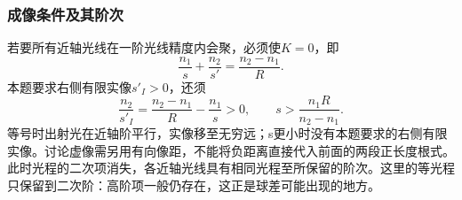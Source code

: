 \documentclass[UTF8,fontset=fandol,a4paper,11pt]{ctexart}
\begin{document}
\subsubsection*{成像条件及其阶次}
若要所有近轴光线在一阶光线精度内会聚，必须使$K=0$，即
\[
\boxed{\frac{n_1}{s}+\frac{n_2}{s'}
=\frac{n_2-n_1}{R}}.
\]
本题要求右侧有限实像$s'_I>0$，还须
\[
\frac{n_2}{s'_I}=\frac{n_2-n_1}{R}-\frac{n_1}{s}>0,
\qquad
s>\frac{n_1R}{n_2-n_1}.
\]
等号时出射光在近轴阶平行，实像移至无穷远；s更小时没有本题要求的右侧有限实像。讨论虚像需另用有向像距，不能将负距离直接代入前面的两段正长度根式。
此时光程的二次项消失，各近轴光线具有相同光程至所保留的阶次。这里的等光程只保留到二次阶：高阶项一般仍存在，这正是球差可能出现的地方。
\begin{center}\begin{minipage}{.98\linewidth}\centering
{}
\end{minipage}
\end{center}
\end{document}
